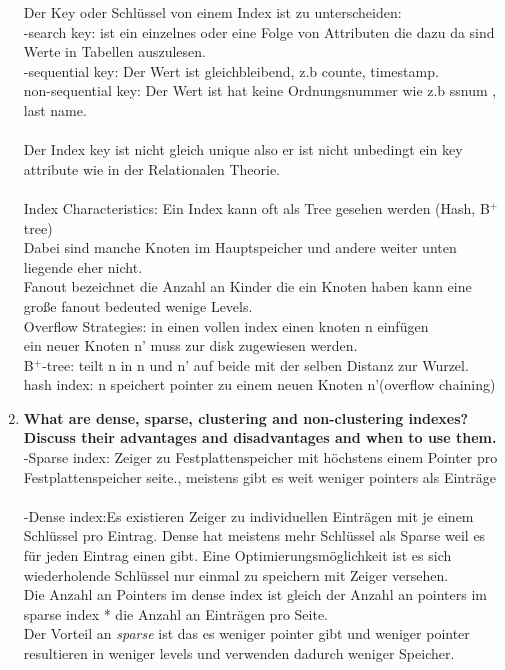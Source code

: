 \documentclass[12pt]{article}\pagestyle{myheadings}
\theoremstyle{plain}
\begin{document}
\begin{enumerate}
Der Key oder Schlüssel von einem Index ist zu unterscheiden:\\
-search key: ist ein einzelnes oder eine Folge von Attributen die dazu da sind Werte in Tabellen auszulesen.\\
-sequential key: Der Wert ist gleichbleibend, z.b counte, timestamp.\\
non-sequential key: Der Wert ist hat keine Ordnungsnummer wie z.b ssnum , last name.\\ \\
Der Index key ist nicht gleich unique also er ist nicht unbedingt ein key attribute wie in der Relationalen Theorie.\\\\
Index Characteristics: Ein Index kann oft als Tree gesehen werden (Hash, B$^+$tree)\\
Dabei sind manche Knoten im Hauptspeicher und andere weiter unten liegende eher nicht.\\
Fanout bezeichnet die Anzahl an Kinder die ein Knoten haben kann eine große fanout bedeuted wenige Levels.\\
Overflow Strategies: in einen vollen index einen knoten n einfügen \\
ein neuer Knoten n' muss zur disk zugewiesen werden.\\
B$^+$-tree: teilt n in n und n' auf beide mit der selben Distanz zur Wurzel.\\
hash index: n speichert pointer zu einem neuen Knoten n'(overflow chaining)
\item \textbf{What are dense, sparse, clustering and non-clustering indexes? Discuss their advantages and disadvantages and
when to use them.} \\
-Sparse index: Zeiger zu Festplattenspeicher mit höchstens einem Pointer pro Festplattenspeicher seite., meistens gibt es weit weniger pointers als Einträge\\ \\
-Dense index:Es existieren Zeiger zu individuellen Einträgen mit je einem Schlüssel pro Eintrag.
Dense hat meistens mehr Schlüssel als Sparse weil es für jeden Eintrag einen gibt. Eine Optimierungsmöglichkeit ist es sich wiederholende Schlüssel nur einmal zu speichern mit Zeiger versehen.\\
Die Anzahl an Pointers im  dense index ist gleich der Anzahl an pointers im sparse index * die Anzahl an Einträgen pro Seite.\\
Der Vorteil an \textit{sparse} ist das es weniger pointer gibt und weniger pointer resultieren in weniger levels und verwenden dadurch weniger Speicher.\\

\end{enumerate}
\end{document}
